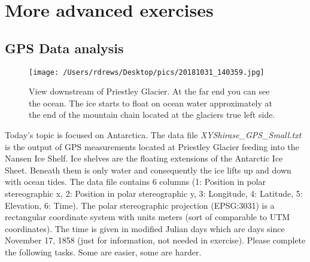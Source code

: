 \section{More advanced exercises}
\subsection{GPS Data analysis}
\begin{figure}
\begin{center}
\texttt{[image: /Users/rdrews/Desktop/pics/20181031\_140359.jpg]}
\caption{View downstream of Priestley Glacier. At the far end you can see the ocean. The ice starts to float on ocean water approximately at the end of the mountain chain located at the glaciers true left side.}
\end{center}
\end{figure}
Today's topic is focused on Antarctica. The data file \textit{XYShirase\_GPS\_Small.txt} is the output of GPS measurements located at Priestley Glacier feeding into the Nansen Ice Shelf. Ice shelves are the floating extensions of the Antarctic Ice Sheet. Beneath them is only water and consequently the ice lifts up and down with ocean tides. The data file contains 6 columns (1: Position in polar stereographic x, 2: Position in polar stereographic y, 3: Longitude, 4: Latitude, 5: Elevation, 6: Time). The polar stereographic projection (EPSG:3031) is a rectangular coordinate system with units meters (sort of comparable to UTM coordinates). The time is given in modified Julian days which are days since November 17, 1858 (just for information, not needed in exercise). Please complete the following tasks. Some are easier, some are harder.

